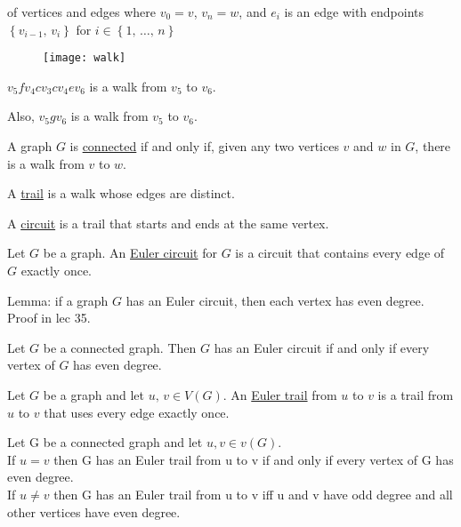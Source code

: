 of vertices and edges where $v_0 = v$, $v_n = w$, and $e_i$ is an edge with endpoints $\left\{v_{i-1},\,v_i\right\}$ for $i\in\left\{1,\,\dots,\,n\right\}$

\begin{example}
    \begin{figure}[H]
        \centering
        \texttt{[image: walk]}
    \end{figure}
    $v_5 f v_4 c v_3 c v_4 e v_6$ is a walk from $v_5$ to $v_6$.

    Also, $v_5 g v_6$ is a walk from $v_5$ to $v_6$.
\end{example}

\begin{definition}
    A graph $G$ is \underline{connected} if and only if, given any two vertices $v$ and $w$ in $G$, there is a walk from $v$ to $w$.

    A \underline{trail} is a walk whose edges are distinct.

    A \underline{circuit} is a trail that starts and ends at the same vertex.
\end{definition}

\begin{definition}
    Let $G$ be a graph. An \underline{Euler circuit} for $G$ is a circuit that contains every edge of $G$ exactly once.

    Lemma: if a graph $G$ has an Euler circuit, then each vertex has even degree. Proof in lec 35.
\end{definition}

\begin{theorm}
    Let $G$ be a connected graph. Then $G$ has an Euler circuit if and only if every vertex of $G$ has even degree.
\end{theorm}

\begin{definition}
    Let $G$ be a graph and let $u,\, v \in V(G)$. An \underline{Euler trail} from $u$ to $v$ is a trail from $u$ to $v$ that uses every edge exactly once.
\end{definition}
\begin{theorm}
    Let G be a connected graph and let \(u, v\in v(G)\).\\
    If \(u = v\) then G has an Euler trail from u to v if and only if every vertex of G has even degree.\\
    If \(u \neq v\) then G has an Euler trail from u to v iff u and v have odd degree and all other vertices have even degree.
\end{theorm}


